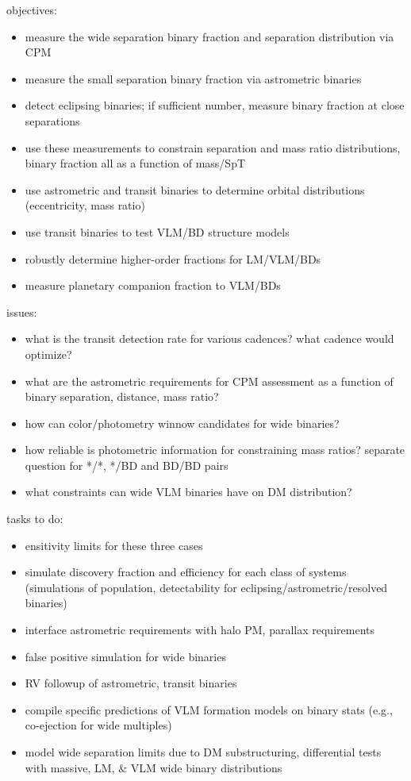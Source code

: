 objectives: 
\begin{itemize}
\item{measure 
the wide separation binary fraction and separation distribution via CPM }
\item{measure 
the small separation binary fraction via astrometric binaries }
\item{detect 
eclipsing binaries; if sufficient number, measure binary fraction at close 
separations }
\item{ use 
these measurements to constrain separation and mass ratio distributions, binary 
fraction all as a function of mass/SpT }
\item{use 
astrometric and transit binaries to determine orbital distributions (eccentricity, 
mass ratio) }
\item{use 
transit binaries to test VLM/BD structure models }
\item{robustly 
determine higher-order fractions for LM/VLM/BDs }
\item{measure 
planetary companion fraction to VLM/BDs }
\end{itemize}

issues: 
\begin{itemize}
\item{what 
is the transit detection rate for various cadences? what cadence would optimize? }
\item{what 
are the astrometric requirements for CPM assessment as a function of {binary 
separation, distance, mass ratio}? }
\item{how 
can color/photometry winnow candidates for wide binaries? }
\item{how 
reliable is photometric information for constraining mass ratios? separate question 
for */*, */BD and BD/BD pairs }
\item{what 
constraints can wide VLM binaries have on DM distribution? }
\end{itemize}

tasks to do: 
\begin{itemize}
\item{ensitivity 
limits for these three cases }
\item{simulate 
discovery fraction and efficiency for each class of systems (simulations of 
population, detectability for eclipsing/astrometric/resolved binaries) }
\item{interface 
astrometric requirements with halo PM, parallax requirements }
\item{false 
positive simulation for wide binaries }
\item{RV 
followup of astrometric, transit binaries }
\item{ compile 
specific predictions of VLM formation models on binary stats (e.g., co-ejection 
for wide multiples) }
\item{ model 
wide separation limits due to DM substructuring, differential tests with massive, 
LM, \& VLM wide binary distributions}
\end{itemize}

